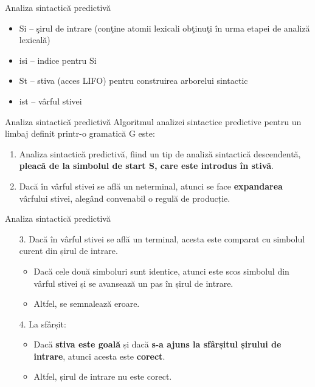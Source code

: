 \documentclass[pdf]{beamer}
\begin{document}
\begin{frame}{ Analiza sintactică predictivă}
\begin{itemize}
\item
Si – şirul de intrare (conţine atomii lexicali obţinuţi în urma etapei de analiză lexicală)
\end{itemize}
\begin{itemize}
\item
isi – indice pentru Si
\end{itemize}
\begin{itemize}
\item
St – stiva (acces LIFO) pentru construirea arborelui sintactic
\end{itemize}
\begin{itemize}
\item
ist – vârful stivei
\end{itemize}
\end{frame}



\begin{frame}{Analiza sintactică predictivă}
Algoritmul analizei sintactice predictive pentru un limbaj definit printr-o gramatică G este:

\begin{enumerate}
\item 
Analiza sintactică predictivă, fiind un tip de analiză sintactică descendentă, \textbf{pleacă de la simbolul de start S, care este introdus în stivă}.

\item 
Dacă în vârful stivei se află un neterminal, atunci se face \textbf{expandarea} vârfului stivei, alegând convenabil o regulă de producție.
\end{enumerate}
\end{frame}



\begin{frame}{Analiza sintactică predictivă}
\begin{enumerate}
\item[3.]
Dacă în vârful stivei se află un terminal, acesta este comparat cu simbolul curent din șirul de intrare. 
\begin{itemize}
\item
Dacă cele două simboluri sunt identice, atunci este scos simbolul din vârful stivei și se avansează un pas în șirul de intrare. 
\item
Altfel, se semnalează eroare.
\end{itemize}

\item[4.]
La sfârșit:
\begin{itemize}
\item
Dacă \textbf{stiva este goală} și dacă \textbf{s-a ajuns la sfârșitul șirului de intrare}, atunci acesta este \textbf{corect}. 
\item
Altfel, șirul de intrare nu este corect.
\end{itemize}
\end{enumerate}
\end{frame}
\end{document}
